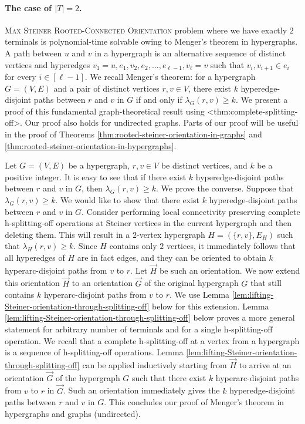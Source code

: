 \documentclass{article}
\def\Cref#1{<#1>}%
\begin{document}
\paragraph{The case of $|T|=2$.} \textsc{Max Steiner Rooted-Connected Orientation} problem where we have exactly $2$ terminals is polynomial-time solvable owing to Menger's theorem in hypergraphs. 
A path between $u$ and $v$ in a hypergraph is an alternative sequence of distinct vertices and hyperedges $v_1=u, e_1, v_2, e_2, ..., e_{\ell-1}, v_{\ell}=v$ such that $v_i, v_{i+1}\in e_i$ for every $i\in [\ell-1]$. 
We recall Menger's theorem: for a hypergraph $G=(V, E)$ and a pair of distinct vertices $r, v\in V$, there exist $k$ hyperedge-disjoint paths between $r$ and $v$ in $G$ if and only if $\lambda_G(r,v)\ge k$. We present a proof of this fundamental graph-theoretical result using \Cref{thm:complete-splitting-off}. Our proof also holds for undirected graphs. 
Parts of our proof will be useful in the proof of Theorems \ref{thm:rooted-steiner-orientation-in-graphs} and \ref{thm:rooted-steiner-orientation-in-hypergraphs}. 

Let $G=(V, E)$ be a hypergraph, $r,v\in V$ be distinct vertices, and $k$ be a positive integer. It is easy to see that if there exist $k$ hyperedge-disjoint paths between $r$ and $v$ in $G$, then $\lambda_G(r,v)\ge k$. We prove the converse. Suppose that $\lambda_G(r, v)\ge k$. We would like to show that there exist $k$ hyperedge-disjoint paths between $r$ and $v$ in $G$. 
Consider performing local connectivity preserving complete h-splitting-off operations at Steiner vertices in the current hypergraph and then deleting them. This will result in a $2$-vertex hypergraph $H=(\{r,v\}, E_H)$ such that $\lambda_H(r,v)\ge k$. Since $H$ contains only $2$ vertices, it immediately follows that all hyperedges of $H$ are in fact edges, and they can be oriented to obtain $k$ hyperarc-disjoint paths 
from $v$ to $r$. 
Let $\overrightarrow{H}$ be such an orientation. 
We now extend this orientation $\overrightarrow{H}$ to an orientation $\overrightarrow{G}$ of the original hypergraph $G$ that still contains $k$ hyperarc-disjoint paths 
from $v$ to $r$. 
We use Lemma \ref{lem:lifting-Steiner-orientation-through-splitting-off} below for this extension. 
Lemma \ref{lem:lifting-Steiner-orientation-through-splitting-off} below proves a more general statement for arbitrary number of terminals and for a single h-splitting-off operation. We recall that a complete h-splitting-off at a vertex from a hypergraph is a sequence of h-splitting-off operations. 
Lemma \ref{lem:lifting-Steiner-orientation-through-splitting-off} can be applied inductively starting from $\overrightarrow{H}$ to arrive at an orientation $\overrightarrow{G}$ of the hypergraph $G$ such that there exist $k$ hyperarc-disjoint paths 
from $v$ to $r$ 
in $\overrightarrow{G}$. Such an orientation immediately gives the $k$ hyperedge-disjoint paths between $r$ and $v$ in $G$. This concludes our proof of Menger's theorem in hypergraphs and graphs (undirected). 
\end{document}
